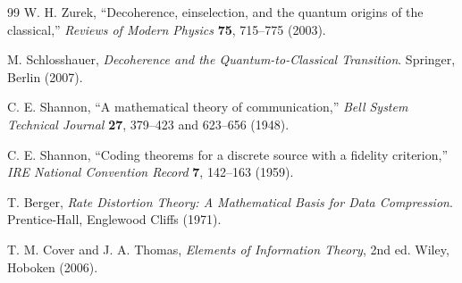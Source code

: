 \documentclass[10pt,a4paper,twocolumn,aps,prl]{revtex4-2}
\begin{document}
\begin{thebibliography}{99}
W. H. Zurek, ``Decoherence, einselection, and the quantum origins of the classical,'' \emph{Reviews of Modern Physics} \textbf{75}, 715--775 (2003).

M. Schlosshauer, \emph{Decoherence and the Quantum-to-Classical Transition}. Springer, Berlin (2007).

C. E. Shannon, ``A mathematical theory of communication,'' \emph{Bell System Technical Journal} \textbf{27}, 379--423 and 623--656 (1948).

C. E. Shannon, ``Coding theorems for a discrete source with a fidelity criterion,'' \emph{IRE National Convention Record} \textbf{7}, 142--163 (1959).

T. Berger, \emph{Rate Distortion Theory: A Mathematical Basis for Data Compression}. Prentice-Hall, Englewood Cliffs (1971).

T. M. Cover and J. A. Thomas, \emph{Elements of Information Theory}, 2nd ed. Wiley, Hoboken (2006).

\end{thebibliography}
\end{document}
